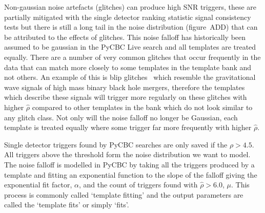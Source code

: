 Non-gaussian noise artefacts (glitches) can produce high SNR triggers, these are partially mitigated with the single detector ranking statistic signal consistency tests but there is still a long tail in the noise distribution (figure~ADD) that can be attributed to the effects of glitches.
%
%
This noise falloff has historically been assumed to be gaussian in the PyCBC Live search and all templates are treated equally. There are a number of very common glitches that occur frequently in the data that can match more closely to some templates in the template bank and not others. An example of this is blip glitches~\cite{blips:2019} which resemble the gravitational wave signals of high mass binary black hole mergers, therefore the templates which describe these signals will trigger more regularly on these glitches with higher $\hat{\rho}$ compared to other templates in the bank which do not look similar to any glitch class. Not only will the noise falloff no longer be Gaussian, each template is treated equally where some trigger far more frequently with higher $\hat{\rho}$.

Single detector triggers found by PyCBC searches are only saved if the $\rho > 4.5$. All triggers above the threshold form the noise distribution we want to model. The noise falloff is modelled in PyCBC by taking all the triggers produced by a template and fitting an exponential function to the slope of the falloff giving the exponential fit factor, $\alpha$, and the count of triggers found with $\hat{\rho} > 6.0$, $\mu$. This process is commonly called `template fitting' and the output parameters are called the `template fits' or simply `fits'.

